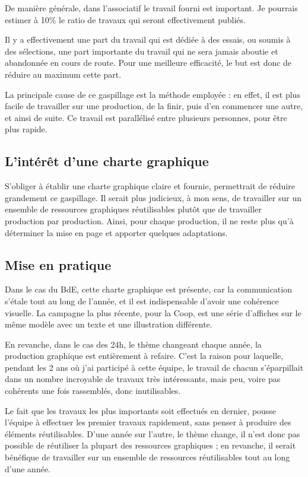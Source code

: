     De manière générale, dans l'associatif le travail fourni est important. Je pourrais estimer à 10\% le ratio de travaux qui seront effectivement publiés.

    Il y a effectivement une part du travail qui est dédiée à des essais, ou soumis à des sélections, une part importante du travail qui ne sera jamais aboutie et abandonnée en cours de route. Pour une meilleure efficacité, le but est donc de réduire au maximum cette part.

    La principale cause de ce gaspillage est la méthode employée : en effet, il est plus facile de travailler sur une production, de la finir, puis d'en commencer une autre, et ainsi de suite. Ce travail est parallélisé entre plusieurs personnes, pour être plus rapide.

    \subsection{L'intérêt d'une charte graphique}
    
        S'obliger à établir une charte graphique claire et fournie, permettrait de réduire grandement ce gaspillage.
        Il serait plus judicieux, à mon sens, de travailler sur un ensemble de ressources graphiques réutilisables plutôt que de travailler production par production.
        Ainsi, pour chaque production, il ne reste plus qu'à déterminer la mise en page et  apporter quelques adaptations.

    \subsection{Mise en pratique}

        Dans le cas du BdE, cette charte graphique est présente, car la communication s'étale tout au long de l'année, et il est indispensable d'avoir une cohérence visuelle.
        La campagne la plus récente, pour la Coop, est une série d'affiches sur le même modèle avec un texte et une illustration différente.
        
        En revanche, dans le cas des 24h,  le thème changeant chaque année, la production graphique est entièrement à refaire.
        C'est la raison pour laquelle, pendant les 2 ans où j'ai participé à cette équipe, le travail de chacun s'éparpillait dans un nombre incroyable de travaux très intéressants, mais peu, voire pas cohérents une fois rassemblés, donc inutilisables.
        
        Le fait que les travaux les plus importants soit effectués en dernier, pousse l'équipe à effectuer les premier travaux rapidement, sans penser à produire des éléments réutilisables.
        D'une année sur l'autre, le thème change, il n'est donc pas possible de réutiliser la plupart des ressources graphiques ; en revanche, il serait bénéfique de travailler sur un ensemble de ressources réutilisables tout au long d'une année.

